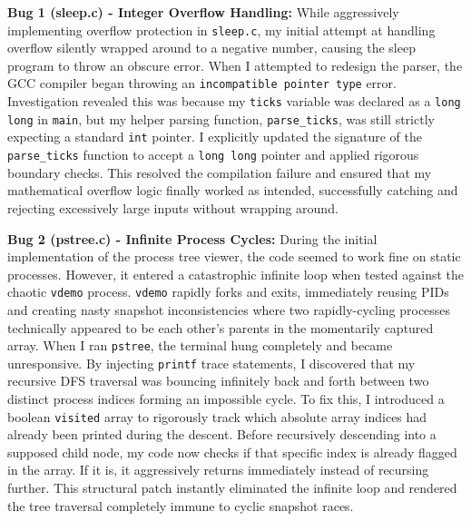 \documentclass[11pt,a4paper]{article}
\begin{document}
\textbf{Bug 1 (sleep.c) - Integer Overflow Handling:} While aggressively implementing overflow protection in \texttt{sleep.c}, my initial attempt at handling overflow silently wrapped around to a negative number, causing the sleep program to throw an obscure error. When I attempted to redesign the parser, the GCC compiler began throwing an \texttt{incompatible pointer type} error. Investigation revealed this was because my \texttt{ticks} variable was declared as a \texttt{long long} in \texttt{main}, but my helper parsing function, \texttt{parse\_ticks}, was still strictly expecting a standard \texttt{int} pointer. I explicitly updated the signature of the \texttt{parse\_ticks} function to accept a \texttt{long long} pointer and applied rigorous boundary checks. This resolved the compilation failure and ensured that my mathematical overflow logic finally worked as intended, successfully catching and rejecting excessively large inputs without wrapping around.

\textbf{Bug 2 (pstree.c) - Infinite Process Cycles:} During the initial implementation of the process tree viewer, the code seemed to work fine on static processes. However, it entered a catastrophic infinite loop when tested against the chaotic \texttt{vdemo} process. \texttt{vdemo} rapidly forks and exits, immediately reusing PIDs and creating nasty snapshot inconsistencies where two rapidly-cycling processes technically appeared to be each other's parents in the momentarily captured array. When I ran \texttt{pstree}, the terminal hung completely and became unresponsive. By injecting \texttt{printf} trace statements, I discovered that my recursive DFS traversal was bouncing infinitely back and forth between two distinct process indices forming an impossible cycle. To fix this, I introduced a boolean \texttt{visited} array to rigorously track which absolute array indices had already been printed during the descent. Before recursively descending into a supposed child node, my code now checks if that specific index is already flagged in the array. If it is, it aggressively returns immediately instead of recursing further. This structural patch instantly eliminated the infinite loop and rendered the tree traversal completely immune to cyclic snapshot races.
\end{document}
